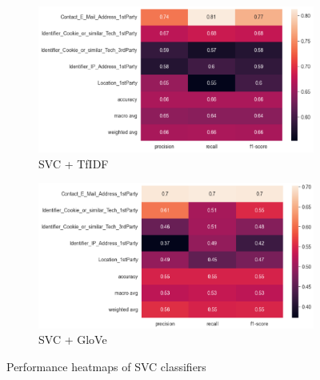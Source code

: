 \begin{figure}[!ht]
	\begin{subfigure}[b]{1\textwidth}
	  \centering
	  \includegraphics[width=\linewidth]{figures/heatmap_svc_tfidf.png}
	  \caption{SVC + TfIDF}
	\end{subfigure}
	\hfill
	\begin{subfigure}[b]{1\textwidth}
	  \centering
	  \includegraphics[width=\linewidth]{figures/heatmap_svc_glove.png}
	  \caption{SVC + GloVe}
	\end{subfigure}
	\caption{Performance heatmaps of SVC classifiers}
	\label{fig:heatmaps_perf_svc}
\end{figure}

